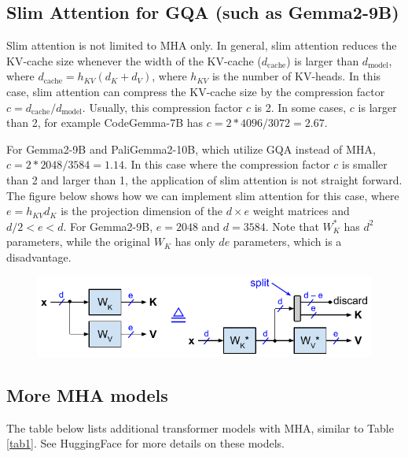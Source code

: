 \documentclass{article}
\begin{document}
\subsection*{Slim Attention for GQA (such as Gemma2-9B)}
Slim attention is not limited to MHA only. In general, slim attention reduces the KV-cache size whenever the width of the KV-cache ($d_\text{cache}$) is larger than $d_\text{model}$, where $d_\text{cache} = h_{KV} (d_K + d_V)$, where $h_{KV}$ is the number of KV-heads. In this case, slim attention can compress the KV-cache size by the compression factor $c = d_\text{cache} / d_\text{model}$. Usually, this compression factor $c$ is 2. In some cases, $c$ is larger than 2, for example CodeGemma-7B has $c = 2*4096 / 3072 = 2.67$.

For Gemma2-9B and PaliGemma2-10B, which utilize GQA instead of MHA, $c = 2*2048/3584 = 1.14$. In this case where the compression factor $c$ is smaller than 2 and larger than 1, the application of slim attention is not straight forward. The figure below shows how we can implement slim attention for this case, where $e = h_{KV} d_K$ is the projection dimension of the $d \times e$ weight matrices and $d/2 < e < d$. For Gemma2-9B, $e = 2048$ and $d = 3584$. Note that $W_K^\ast$ has $d^2$ parameters, while the original $W_K$ has only $d e$ parameters, which is a disadvantage.
\begin{figure}[h!] \centering
  \includegraphics[scale=0.88]{../doc/fig/slimAttn_fig7.pdf}
\label{fig7} \end{figure}

\subsection*{More MHA models}
The table below lists additional transformer models with MHA, similar to Table \ref{tab1}. See HuggingFace for more details on these models.
\end{document}
